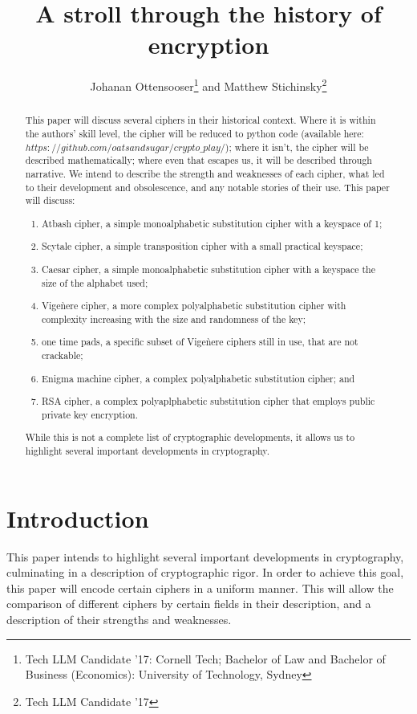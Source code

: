 \documentclass{AIAA}
\begin{document}
\title{A stroll through the history of encryption}

\author{Johanan Ottensooser\footnote{Tech LLM Candidate '17: Cornell Tech; Bachelor of Law and Bachelor of Business (Economics): University of Technology, Sydney} and Matthew Stichinsky\footnote{Tech LLM Candidate '17}}

\begin{abstract}
This paper will discuss several ciphers in their historical context. Where it is within the authors' skill level, the cipher will be reduced to python code (available here: $https://github.com/oatsandsugar/crypto\_play/$); where it isn't, the cipher will be described mathematically; where even that escapes us, it will be described through narrative. We intend to describe the strength and weaknesses of each cipher, what led to their development and obsolescence, and any notable stories of their use. 
This paper will discuss:
\begin{enumerate}
\item Atbash cipher, a simple monoalphabetic substitution cipher with a keyspace of 1;
\item Scytale cipher, a simple transposition cipher with a small practical keyspace;
\item Caesar cipher, a simple monoalphabetic substitution cipher with a keyspace the size of the alphabet used;
\item Vige\`nere cipher, a more complex polyalphabetic substitution cipher with complexity increasing with the size and randomness of the key;
\item one time pads, a specific subset of Vige\`nere ciphers still in use, that are not crackable;
\item Enigma machine cipher, a complex polyalphabetic substitution cipher; and
\item RSA cipher, a complex polyaplphabetic substitution cipher that employs public private key encryption.
\end{enumerate}
While this is not a complete list of cryptographic developments, it allows us to highlight several important developments in cryptography.
\end{abstract}

\maketitle

\section{Introduction}
This paper intends to highlight several important developments in cryptography, culminating in a description of cryptographic rigor. In order to achieve this goal, this paper will encode certain ciphers in a uniform manner. This will allow the comparison of different ciphers by certain fields in their description, and a description of their strengths and weaknesses. 
\end{document}
